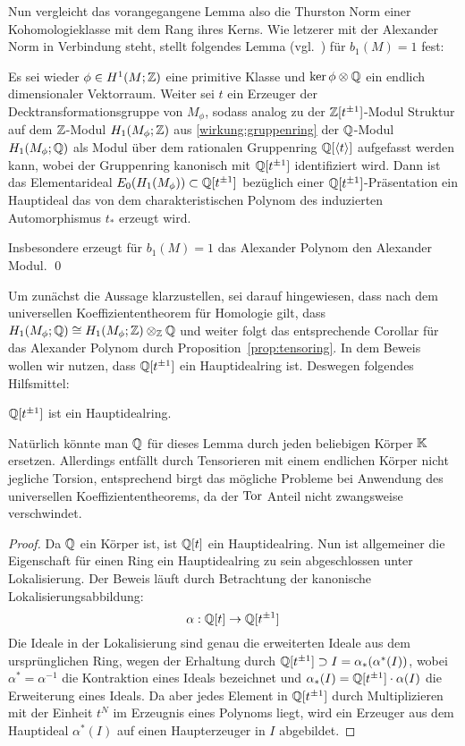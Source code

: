 Nun vergleicht das vorangegangene Lemma also die Thurston Norm einer Kohomologieklasse mit dem Rang ihres Kerns. Wie letzerer mit der Alexander Norm in Verbindung steht, stellt folgendes Lemma (vgl.~\cite[Assertion~4]{Milnor.2009}) für $b_1(M)=1$ fest:
\begin{lem}
	\label{lem:charPol}
	Es sei wieder $\phi \in H^1(M;\mathbb{Z})$ eine primitive Klasse und $\ker \phi \otimes \mathbb{Q}$ ein endlich dimensionaler Vektorraum. Weiter sei $t$ ein Erzeuger der Decktransformationsgruppe von $M_\phi$, sodass analog zu der $\mathbb{Z}[t^{\pm 1}]$-Modul Struktur auf dem $\mathbb{Z}$-Modul $H_1(M_\phi;\mathbb{Z})$ aus \ref{wirkung:gruppenring} der $\mathbb{Q}$-Modul $H_1(M_\phi;\mathbb{Q})$ als Modul über dem rationalen Gruppenring $\mathbb{Q}[\langle t \rangle]$ aufgefasst werden kann, wobei der Gruppenring kanonisch mit $\mathbb{Q}[t^{\pm 1}]$ identifiziert wird. Dann ist das Elementarideal $E_0(H_1(M_\phi))\subset \mathbb{Q}[t^{\pm1}]$ bezüglich einer $\mathbb{Q}[t^{\pm 1}]$-Präsentation ein Hauptideal das von dem charakteristischen Polynom des induzierten Automorphismus $t_*$ erzeugt wird.
\end{lem}
\begin{cor}
	Insbesondere erzeugt für $b_1(M)=1$ das Alexander Polynom den Alexander Modul. \qed
\end{cor}
Um zunächst die Aussage klarzustellen, sei darauf hingewiesen, dass nach dem universellen Koeffiziententheorem für Homologie gilt, dass $H_1(M_\phi;\mathbb{Q}) \cong H_1(M_\phi;\mathbb{Z})\otimes_{\mathbb{Z}} \mathbb{Q}$ und weiter folgt das entsprechende Corollar für das Alexander Polynom durch Proposition~\ref{prop:tensoring}.
In dem Beweis wollen wir nutzen, dass $\mathbb{Q}[t^{\pm 1}]$ ein Hauptidealring ist. Deswegen folgendes Hilfsmittel:
\begin{lem}
\label{lem:QThauptidealring}
	$\mathbb{Q}[t^{\pm 1}]$ ist ein Hauptidealring.
\end{lem}
Natürlich könnte man $\mathbb{Q}$ für dieses Lemma durch jeden beliebigen Körper $\mathbb{K}$ ersetzen. Allerdings entfällt durch Tensorieren mit einem endlichen Körper nicht jegliche Torsion, entsprechend birgt das mögliche Probleme bei Anwendung des universellen Koeffiziententheorems, da der $\operatorname{Tor}$ Anteil nicht zwangsweise verschwindet.
\begin{proof}
	Da $\mathbb{Q}$ ein Körper ist, ist $\mathbb{Q}[t]$ ein Hauptidealring. Nun ist allgemeiner die Eigenschaft für einen Ring ein Hauptidealring zu sein abgeschlossen unter Lokalisierung. Der Beweis läuft durch Betrachtung der kanonische Lokalisierungsabbildung:
	\[
		\alpha : \mathbb{Q}[t] \to \mathbb{Q}[t^{\pm 1}]
	\]
	Die Ideale in der Lokalisierung sind genau die erweiterten Ideale aus dem ursprünglichen Ring, wegen der Erhaltung durch $\mathbb{Q}[t^{\pm 1}] \supset I=\alpha_*(\alpha^*(I))$, wobei $\alpha^* = \alpha^{-1}$ die Kontraktion eines Ideals bezeichnet und $\alpha_*(I) = \mathbb{Q}[t^{\pm 1}] \cdot \alpha(I)$ die Erweiterung eines Ideals. Da aber jedes Element in $\mathbb{Q}[t^{\pm 1}]$ durch Multiplizieren mit der Einheit $t^N$ im Erzeugnis eines Polynoms liegt, wird ein Erzeuger aus dem Hauptideal $\alpha^*(I)$ auf einen Haupterzeuger in $I$ abgebildet. 
\end{proof}

